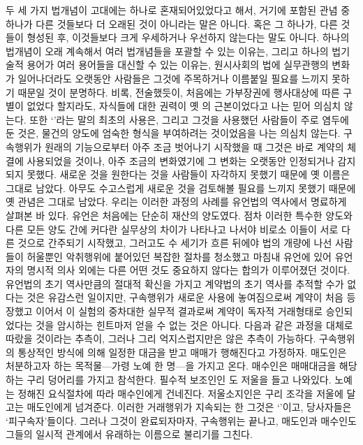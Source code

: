 두 세 가지 법개념이 고대에는 하나로 혼재되어있었다고 해서,
거기에 포함된 관념 중 하나가 다른 것들보다 더 오래된 것이 아니라는
말은 아니다.
혹은 그 하나가, 다른 것들이 형성된 후,
이것들보다 크게 우세하거나 우선하지 않는다는 말도 아니다.
하나의 법개념이 오래 계속해서 여러 법개념들을 포괄할 수 있는 이유는,
그리고 하나의 법기술적 용어가 여러 용어들을 대신할 수 있는 이유는,
원시사회의 법에 실무관행의 변화가 일어나더라도
오랫동안 사람들은 그것에 주목하거나 이름붙일
필요를 느끼지 못하기 때문일 것이 분명하다.
비록, 전술했듯이,
처음에는 가부장권에 행사대상에 따른 구별이 없었다 할지라도,
자식들에 대한 권력이 옛 의 근본이었다고
나는 믿어 의심치 않는다.
또한
`'라는 말의 최초의 사용은,
그리고 그것을 사용했던 사람들이 주로 염두에 둔 것은,
물건의 양도에 엄숙한 형식을 부여하려는 것이었음을
나는 의심치 않는다.
구속행위가 원래의 기능으로부터 아주 조금 벗어나기 시작했을 때
그것은 바로 계약의 체결에 사용되었을 것이나,
아주 조금의 변화였기에 그 변화는 오랫동안 인정되거나 감지되지 못했다.
새로운 것을 원한다는 것을 사람들이 자각하지 못했기 때문에
옛 이름은 그대로 남았다.
아무도 수고스럽게 새로운 것을 검토해볼 필요를 느끼지 못했기 때문에
옛 관념은 그대로 남았다.
우리는 이러한 과정의 사례를 유언법의 역사에서 명료하게 살펴본 바 있다.
유언은 처음에는 단순히 재산의 양도였다.
점차 이러한 특수한 양도와 다른 모든 양도 간에 커다란 실무상의 차이가
나타나고 나서야 비로소
이들이
서로 다른 것으로 간주되기 시작했고,
그러고도 수 세기가 흐른 뒤에야
법의 개량에 나선 사람들이
허울뿐인 악취행위에 붙어있던 복잡한 절차를
청소했고 마침내
유언에 있어
유언자의 명시적 의사 외에는 다른 어떤 것도 중요하지 않다는
합의가 이루어졌던 것이다.
유언법의 초기 역사만큼의
절대적 확신을 가지고
계약법의 초기 역사를 추적할 수가 없다는 것은 유감스런 일이지만,
구속행위가 새로운 사용에 놓여짐으로써
계약이 처음 등장했고
이어서
이 실험의 중차대한 실무적 결과로써
계약이 독자적 거래형태로 승인되었다는 것을 암시하는
힌트마저 얻을 수 없는 것은 아니다.
다음과 같은 과정을 대체로 따랐을 것이라는 추측이,
그러나 그리 억지스럽지만은 않은 추측이 가능하다.
구속행위의 통상적인 방식에 의해
일정한 대금을 받고 매매가 행해진다고 가정하자.
매도인은 처분하고자 하는 목적물---가령 노예 한 명---을 가지고 온다.
매수인은 매매대금을 해당하는 구리 덩어리를 가지고 참석한다.
필수적 보조인인 도 저울을 들고 나와있다.
노예는 정해진 요식절차에 따라 매수인에게 건네진다.
저울소지인은 구리 조각을 저울에 달고는 매도인에게 넘겨준다.
이러한 거래행위가 지속되는 한 그것은 `'이고,
당사자들은 `피구속자'들이다.
그러나 그것이 완료되자마자,
구속행위는 끝나고,
매도인과 매수인도 그들의 일시적 관계에서 유래하는 이름으로 불리기를 그친다.

